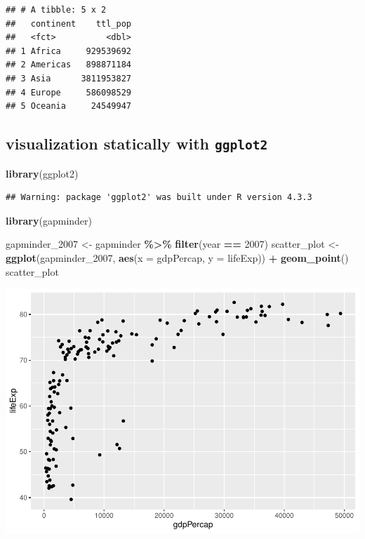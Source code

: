 \documentclass[
]{book}
\newenvironment{Shaded}{\begin{snugshade}}{\end{snugshade}}
\newcommand{\AttributeTok}[1]{\textcolor[rgb]{0.13,0.29,0.53}{#1}}
\newcommand{\DecValTok}[1]{\textcolor[rgb]{0.00,0.00,0.81}{#1}}
\newcommand{\FunctionTok}[1]{\textcolor[rgb]{0.13,0.29,0.53}{\textbf{#1}}}
\newcommand{\NormalTok}[1]{#1}
\newcommand{\OtherTok}[1]{\textcolor[rgb]{0.56,0.35,0.01}{#1}}
\newcommand{\SpecialCharTok}[1]{\textcolor[rgb]{0.81,0.36,0.00}{\textbf{#1}}}
\theoremstyle{definition}
\theoremstyle{definition}
\theoremstyle{definition}
\theoremstyle{definition}
\theoremstyle{remark}
\begin{document}
\begin{verbatim}
## # A tibble: 5 x 2
##   continent    ttl_pop
##   <fct>          <dbl>
## 1 Africa     929539692
## 2 Americas   898871184
## 3 Asia      3811953827
## 4 Europe     586098529
## 5 Oceania     24549947
\end{verbatim}

\hypertarget{visualization-statically-with-ggplot2}{%
\subsection{\texorpdfstring{visualization statically with \texttt{ggplot2}}{visualization statically with ggplot2}}\label{visualization-statically-with-ggplot2}}

\begin{Shaded}
\begin{Highlighting}[]
\FunctionTok{library}\NormalTok{(ggplot2)}
\end{Highlighting}
\end{Shaded}

\begin{verbatim}
## Warning: package 'ggplot2' was built under R version 4.3.3
\end{verbatim}

\begin{Shaded}
\begin{Highlighting}[]
\FunctionTok{library}\NormalTok{(gapminder)}

\NormalTok{gapminder\_2007 }\OtherTok{\textless{}{-}}\NormalTok{ gapminder }\SpecialCharTok{\%\textgreater{}\%}
  \FunctionTok{filter}\NormalTok{(year }\SpecialCharTok{==} \DecValTok{2007}\NormalTok{)}
\NormalTok{scatter\_plot }\OtherTok{\textless{}{-}} \FunctionTok{ggplot}\NormalTok{(gapminder\_2007, }\FunctionTok{aes}\NormalTok{(}\AttributeTok{x =}\NormalTok{ gdpPercap, }\AttributeTok{y =}\NormalTok{ lifeExp)) }\SpecialCharTok{+}
  \FunctionTok{geom\_point}\NormalTok{()}
\NormalTok{scatter\_plot}
\end{Highlighting}
\end{Shaded}

\includegraphics{202402211401-R_files/figure-latex/unnamed-chunk-19-1.pdf}
\end{document}

